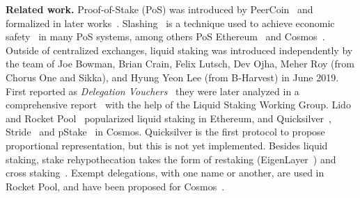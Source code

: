 \noindent
\textbf{Related work.}
Proof-of-Stake (PoS) was introduced by PeerCoin~\cite{peercoin} and formalized
in later works~\cite{ouroboros,praos,ouroboros-genesis,algorand,DBLP:journals/iacr/BentovPS16a}.
Slashing~\cite{slashing} is a technique used to achieve economic safety~\cite{slashable-safety}
in many PoS systems, among others
PoS Ethereum~\cite{casper,buterin2020combining}
and Cosmos~\cite{2018tendermint,buchman2016tendermint,cosmossdk}.
Outside of centralized exchanges, liquid staking was introduced independently by
the team of Joe Bowman, Brian Crain, Felix Lutsch, Dev Ojha, Meher Roy (from Chorus One and Sikka),
and Hyung Yeon Lee (from B-Harvest) in June 2019.
First reported as \emph{Delegation Vouchers}~\cite{delegation-vouchers}
they were later analyzed in a comprehensive report~\cite{liquid-staking-report} with
the help of the Liquid Staking Working Group.
Lido~\cite{lido} and Rocket Pool~\cite{rocket-pool} popularized liquid staking
in Ethereum, and Quicksilver~\cite{quicksilver}, Stride~\cite{stride} and
pStake~\cite{pstake} in Cosmos. Quicksilver is the first protocol to propose proportional
representation, but this is not yet implemented.
Besides liquid staking, stake rehypothecation takes the form of
restaking (EigenLayer~\cite{eigenlayer}) and cross staking~\cite{mesh-security}.
Exempt delegations, with one name or another, are used in Rocket Pool,
and have been proposed for Cosmos~\cite{adr-liquid-staking}.
